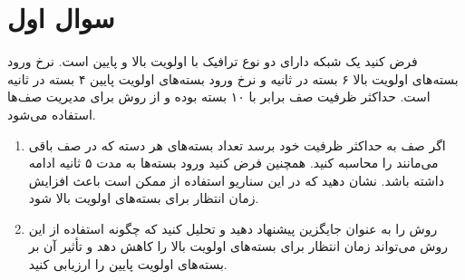 \section{سوال اول}

فرض کنید یک شبکه دارای دو نوع ترافیک با اولویت بالا و پایین است. نرخ ورود بسته‌های اولویت بالا ۶ بسته در ثانیه و نرخ ورود بسته‌های اولویت پایین ۴ بسته در ثانیه است. حداکثر ظرفیت صف برابر با ۱۰ بسته بوده و از روش  برای مدیریت صف‌ها استفاده می‌شود.

\begin{enumerate}
	\item 
	اگر صف به حداکثر ظرفیت خود برسد تعداد بسته‌های هر دسته که در صف باقی می‌مانند را محاسبه کنید. همچنین فرض کنید ورود بسته‌ها به مدت ۵ ثانیه ادامه داشته باشد. نشان دهید که در این سناریو استفاده از  ممکن است باعث افزایش زمان	 انتظار برای بسته‌های اولویت بالا شود.
	
	\begin{qsolve}
		
	\end{qsolve}
	
	
	\item 
	روش  را به عنوان جایگزین پیشنهاد دهید و تحلیل کنید که چگونه استفاده از این روش می‌تواند زمان انتظار برای بسته‌های اولویت بالا را کاهش دهد و تأثیر آن بر بسته‌های اولویت پایین را ارزیابی کنید.
	
	\begin{qsolve}
		
	\end{qsolve}
	
	
\end{enumerate}